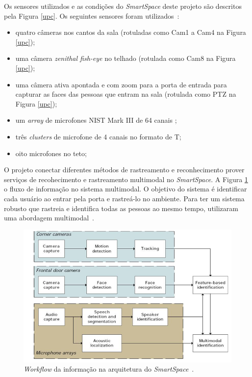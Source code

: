 Os sensores utilizados e as condições do \textit{SmartSpace} deste projeto são descritos pela Figura \ref{upc}. Os seguintes sensores foram utilizados~\cite{salah}:

	\begin{itemize}
		\item quatro câmeras nos cantos da sala (rotuladas como Cam1 a Cam4 na Figura \ref{upc});
		\item uma câmera \textit{zenithal fish-eye} no telhado (rotulada como Cam8 na Figura \ref{upc});
		\item uma câmera ativa apontada e com zoom para a porta de entrada para capturar as faces das pessoas que entram na sala (rotulada como PTZ na Figura \ref{upc});
		\item um \textit{array} de microfones NIST Mark III de 64 canais ;
		\item três \textit{clusters} de microfone de 4 canais no formato de T;
		\item oito microfones no teto;
	\end{itemize}

O projeto conectar diferentes métodos de rastreamento e reconhecimento prover serviços de recohecimento e rastreamento multimodal no \textit{SmartSpace}. A Figura \ref{workflow} o fluxo de informação no sistema multimodal. O objetivo do sistema é identificar cada usuário ao entrar pela porta e rastreá-lo no ambiente. Para ter um sistema robusto que rastreia e identifica todas as pessoas ao mesmo tempo, utilizaram uma abordagem multimodal~\cite{salah}.

\begin{figure}[hbt]
		\begin{center}
			\includegraphics[scale=0.5]{figuras/3.TrabalhosCorrelatos/workflow.png}
		\end{center}
		\caption{\textit{Workflow} da informação na arquitetura do \textit{SmartSpace}~\cite{salah}.}
		\label{workflow}
	\end{figure}

